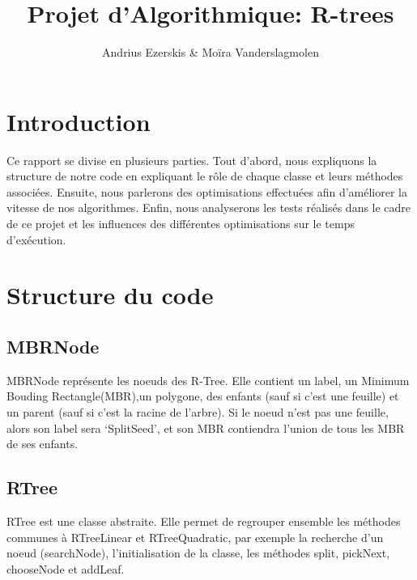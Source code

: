 \documentclass[utf8]{article}
\begin{document}
\begin{titlepage}


  \author{Andrius Ezerskis \& Moïra Vanderslagmolen}
  \title{Projet d'Algorithmique: R-trees}
  \maketitle
\end{titlepage}
\tableofcontents
\newpage
\begin{large}


  \section{Introduction}
  \indent
  \par
  Ce rapport se divise en plusieurs parties. Tout d'abord, nous expliquons la
  structure de notre code en expliquant le rôle de chaque classe et leurs
  méthodes associées. Ensuite, nous parlerons des optimisations effectuées afin
  d'améliorer la vitesse de nos algorithmes. Enfin, nous analyserons les tests
  réalisés dans le cadre de ce projet et les influences des différentes
  optimisations sur le temps d'exécution.
  \par
  \section{Structure du code}

  \par
  \subsection{MBRNode}
  \indent
  \par
  MBRNode représente les noeuds des R-Tree. Elle contient un label, un Minimum Bouding Rectangle(MBR),un polygone,
  des enfants (sauf si c'est une feuille) et un parent (sauf si c'est la racine de
  l'arbre). Si le noeud n'est pas une feuille, alors son label sera `SplitSeed',
  et son MBR contiendra l'union de tous les MBR de ses enfants.
  \par

  \subsection{RTree}\label{RTree}
  \indent
  \par
  RTree est une classe abstraite. Elle permet de regrouper ensemble les méthodes
  communes à RTreeLinear et RTreeQuadratic, par exemple la recherche d'un noeud
  (searchNode), l'initialisation de la classe, les méthodes split, pickNext,
  chooseNode et addLeaf.
  \par


\end{large}
\end{document}
